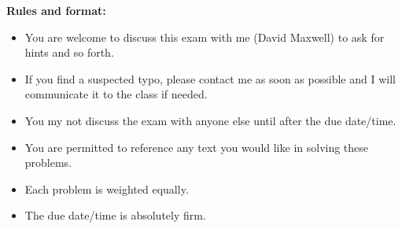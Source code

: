 \documentclass[minion]{homework}
\begin{document}
{\bf  Rules and format:}
\begin{itemize}

\item You are welcome to discuss this exam with me (David Maxwell) to ask for hints and so forth.
\item  If you find a suspected typo, please contact me as soon as possible and I will
communicate it to the class if needed.
\item You my not discuss the exam with anyone else until after the due date/time.
\item You are permitted to reference any text you would like in solving these problems.
\item Each problem is weighted equally.
\item The due date/time is absolutely firm.
\end{itemize}
\end{document}
